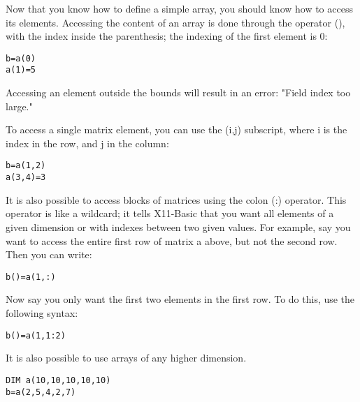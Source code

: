 Now that you know how to define a simple array, you should know how to access 
its elements. Accessing the content of an array is done through the 
operator (), with the index inside the parenthesis; the indexing of the first 
element is 0:
\begin{mdframed}[hidealllines=true,backgroundcolor=blue!20]
\begin{verbatim}
b=a(0)
a(1)=5
\end{verbatim}
\end{mdframed}

Accessing an element outside the bounds will result in an error: 
"Field index too large."

To access a single matrix element, you can use the (i,j) subscript, where i is
the index in the row, and j in the column:
\begin{mdframed}[hidealllines=true,backgroundcolor=blue!20]
\begin{verbatim}
b=a(1,2)
a(3,4)=3
\end{verbatim}
\end{mdframed}

It is also possible to access blocks of matrices using the colon (:) operator. 
This operator is like a wildcard; it tells X11-Basic that you want all elements 
of a given dimension or with indexes between two given values. For example, 
say you want to access the entire first row of matrix a above, but not the 
second row. Then you can write:
\begin{mdframed}[hidealllines=true,backgroundcolor=blue!20]
\begin{verbatim}
b()=a(1,:)
\end{verbatim}
\end{mdframed}

Now say you only want the first two elements in the first row. To do this, use
the following syntax:
\begin{mdframed}[hidealllines=true,backgroundcolor=blue!20]
\begin{verbatim}
b()=a(1,1:2)
\end{verbatim}
\end{mdframed}

It is also possible to use arrays of any higher dimension.
\begin{mdframed}[hidealllines=true,backgroundcolor=blue!20]
\begin{verbatim}
DIM a(10,10,10,10,10)
b=a(2,5,4,2,7)
\end{verbatim}
\end{mdframed}


